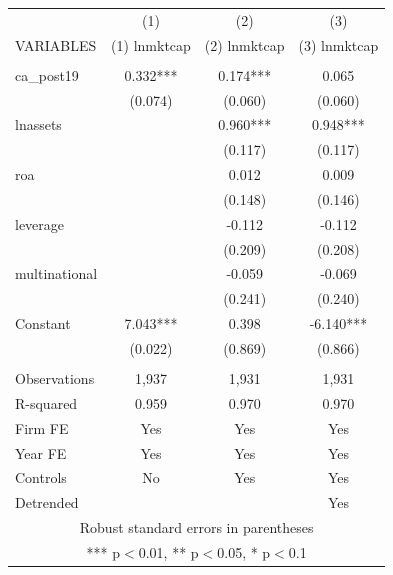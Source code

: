 \begin{tabular}{lccc} \hline
 & (1) & (2) & (3) \\
VARIABLES & (1) lnmktcap & (2) lnmktcap & (3) lnmktcap \\ \hline
 &  &  &  \\
ca\_post19 & 0.332*** & 0.174*** & 0.065 \\
 & (0.074) & (0.060) & (0.060) \\
lnassets &  & 0.960*** & 0.948*** \\
 &  & (0.117) & (0.117) \\
roa &  & 0.012 & 0.009 \\
 &  & (0.148) & (0.146) \\
leverage &  & -0.112 & -0.112 \\
 &  & (0.209) & (0.208) \\
multinational &  & -0.059 & -0.069 \\
 &  & (0.241) & (0.240) \\
Constant & 7.043*** & 0.398 & -6.140*** \\
 & (0.022) & (0.869) & (0.866) \\
 &  &  &  \\
Observations & 1,937 & 1,931 & 1,931 \\
R-squared & 0.959 & 0.970 & 0.970 \\
Firm FE & Yes & Yes & Yes \\
Year FE & Yes & Yes & Yes \\
Controls & No & Yes & Yes \\
 Detrended &  &  & Yes \\ \hline
\multicolumn{4}{c}{ Robust standard errors in parentheses} \\
\multicolumn{4}{c}{ *** p$<$0.01, ** p$<$0.05, * p$<$0.1} \\
\end{tabular}
